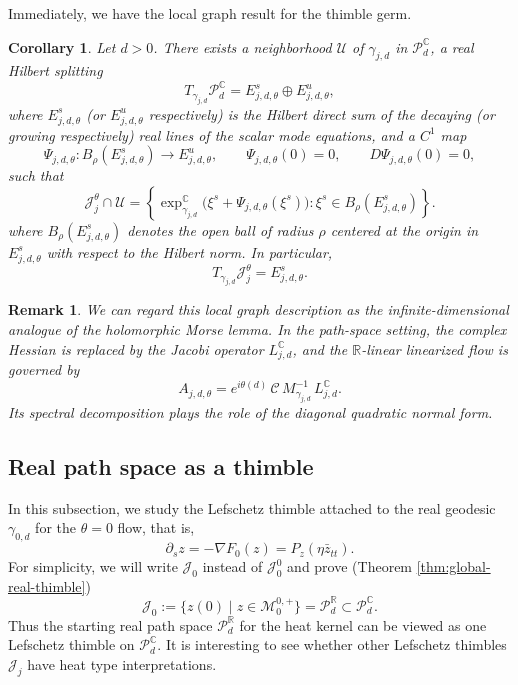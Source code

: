 \documentclass[11pt]{amsart}
\theoremstyle{plain}
\newtheorem{cor}[thm]{Corollary}
\newtheorem{rmk}[thm]{Remark}
\theoremstyle{definition}
\newcommand{\R}{\mathbb{R}}
\newcommand{\C}{\mathbb{C}}
\newcommand{\PP}{\mathcal{P}}
\begin{document}
Immediately, we have the local graph result for the thimble germ.

\begin{cor}\label{cor:localthimble}
Let $d>0$.  There exists a neighborhood $\mathcal{U}$ of $\gamma_{j,d}$ in
$\PP^{\C}_d$, a real Hilbert splitting
\[
T_{\gamma_{j,d}}\PP^{\C}_d
=E^s_{j,d,\theta}\oplus E^u_{j,d,\theta},
\]
where $E^s_{j,d,\theta}$ (or $E^u_{j,d,\theta}$ respectively) is the Hilbert direct sum of the decaying (or growing respectively) real
lines of the scalar mode equations, and a $C^1$ map
\[
\Psi_{j,d,\theta}:B_\rho(E^s_{j,d,\theta})\longrightarrow E^u_{j,d,\theta},
\qquad\Psi_{j,d,\theta}(0)=0,\qquad D\Psi_{j,d,\theta}(0)=0,
\]
such that
\[
\mathcal{J}_j^{\theta}\cap \mathcal{U}=
\left\{\exp_{\gamma_{j,d}}^{\C}\bigl(\xi^s+\Psi_{j,d,\theta}(\xi^s)\bigr):\xi^s\in B_\rho(E^s_{j,d,\theta})\right\}.
\]
where $B_\rho(E^s_{j,d,\theta})$ denotes the open ball of radius $\rho$
centered at the origin in $E^s_{j,d,\theta}$ with respect to the Hilbert norm. In particular,
\[
T_{\gamma_{j,d}}\mathcal{J}_j^{\theta}=E^s_{j,d,\theta}.
\]
\end{cor} 



\begin{rmk} We can regard this local graph description as the infinite-dimensional analogue
of the holomorphic Morse lemma. In the path-space setting, the complex Hessian is replaced by the
Jacobi operator $L^{\C}_{j,d}$, and the $\R$-linear linearized flow is governed
by
\[
A_{j,d,\theta}=e^{i\theta(d)}\,\mathcal{C}\,M_{\gamma_{j,d}}^{-1}\,L^{\C}_{j,d}.
\]
Its spectral decomposition plays the role of
the diagonal quadratic normal form. 
\end{rmk}


\subsection{Real path space as a thimble}
In this subsection, we study the Lefschetz thimble attached to the real geodesic $\gamma_{0,d}$ for the  $\theta=0$ flow, that is,
\begin{equation}\label{eq:flow0}
\partial_s z=-\nabla F_0(z)=P_z(\eta\bar{z}_{tt}). 
\end{equation}
For simplicity, we will write $\mathcal J_0$ instead of $\mathcal J_0^0$ and prove (Theorem \ref{thm:global-real-thimble})
\[\mathcal{J}_0:=\{z(0)\mid z\in\mathcal{M}_0^{0,+}\}=\PP_d^{\R}\subset\PP_d^{\C}.\]
Thus the starting real path space $\PP_d^{\R}$ for the heat kernel can be viewed as one Lefschetz thimble on $\PP_d^{\C}$. It is interesting to see whether other Lefschetz thimbles $\mathcal{J}_j$ have heat type interpretations. 
\end{document}
